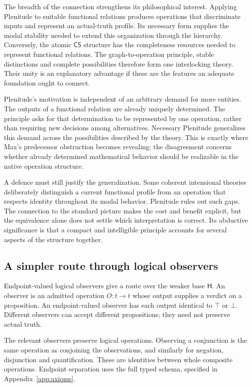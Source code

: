 \documentclass[12pt,letterpaper]{article}
\newcommand{\Hlogic}{\mathsf H}
\newcommand{\Cfive}{\mathsf{C5}}
\begin{document}
The breadth of the connection strengthens its philosophical interest. Applying Plenitude to suitable functional relations produces operations that discriminate inputs and represent an actual-truth profile. Its necessary form supplies the modal stability needed to extend this organization through the hierarchy. Conversely, the atomic $\Cfive$ structure has the completeness resources needed to represent functional relations. The graph-to-operation principle, stable distinctions and complete possibilities therefore form one interlocking theory. Their unity is an explanatory advantage if these are the features an adequate foundation ought to connect.

Plenitude's motivation is independent of an arbitrary demand for more entities. The outputs of a functional relation are already uniquely determined. The principle asks for that determination to be represented by one operation, rather than requiring new decisions among alternatives. Necessary Plenitude generalizes this demand across the possibilities described by the theory. This is exactly where Max's predecessor obstruction becomes revealing: the disagreement concerns whether already determined mathematical behavior should be realizable in the native operation structure.

A defence must still justify the generalization. Some coherent intensional theories deliberately distinguish a current functional profile from an operation that respects identity throughout its modal behavior. Plenitude rules out such gaps. The connection to the standard picture makes the cost and benefit explicit, but the equivalence alone does not settle which interpretation is correct. Its abductive significance is that a compact and intelligible principle accounts for several aspects of the structure together.

\subsection{A simpler route through logical observers}

Endpoint-valued logical observers give a route over the weaker base $\Hlogic$. An observer is an admitted operation $O:t\to t$ whose output supplies a verdict on a proposition. An endpoint-valued observer has each output identical to $\top$ or $\bot$. Different observers can accept different propositions; they need not preserve actual truth.

The relevant observers preserve logical operations. Observing a conjunction is the same operation as conjoining the observations, and similarly for negation, disjunction and quantification. These are identities between whole composite operations. Endpoint separation uses the full typed schema, specified in Appendix~\ref{app:axioms}.
\end{document}

